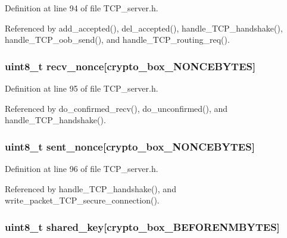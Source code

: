 Definition at line 94 of file T\+C\+P\+\_\+server.\+h.



Referenced by add\+\_\+accepted(), del\+\_\+accepted(), handle\+\_\+\+T\+C\+P\+\_\+handshake(), handle\+\_\+\+T\+C\+P\+\_\+oob\+\_\+send(), and handle\+\_\+\+T\+C\+P\+\_\+routing\+\_\+req().

\hypertarget{struct_t_c_p___secure___connection_aae0467706f97aa3ef23e5dc9c3c199d7}{
\subsubsection[{recv\+\_\+nonce}]{\setlength{\rightskip}{0pt plus 5cm}uint8\+\_\+t recv\+\_\+nonce\mbox{[}crypto\+\_\+box\+\_\+\+N\+O\+N\+C\+E\+B\+Y\+T\+E\+S\mbox{]}}}\label{struct_t_c_p___secure___connection_aae0467706f97aa3ef23e5dc9c3c199d7}


Definition at line 95 of file T\+C\+P\+\_\+server.\+h.



Referenced by do\+\_\+confirmed\+\_\+recv(), do\+\_\+unconfirmed(), and handle\+\_\+\+T\+C\+P\+\_\+handshake().

\hypertarget{struct_t_c_p___secure___connection_a9df0e00e8f493ed6cd1ff45e7da33c0d}{
\subsubsection[{sent\+\_\+nonce}]{\setlength{\rightskip}{0pt plus 5cm}uint8\+\_\+t sent\+\_\+nonce\mbox{[}crypto\+\_\+box\+\_\+\+N\+O\+N\+C\+E\+B\+Y\+T\+E\+S\mbox{]}}}\label{struct_t_c_p___secure___connection_a9df0e00e8f493ed6cd1ff45e7da33c0d}


Definition at line 96 of file T\+C\+P\+\_\+server.\+h.



Referenced by handle\+\_\+\+T\+C\+P\+\_\+handshake(), and write\+\_\+packet\+\_\+\+T\+C\+P\+\_\+secure\+\_\+connection().

\hypertarget{struct_t_c_p___secure___connection_a81ead9fac55a0cedc30a96253a2c5119}{
\subsubsection[{shared\+\_\+key}]{\setlength{\rightskip}{0pt plus 5cm}uint8\+\_\+t shared\+\_\+key\mbox{[}crypto\+\_\+box\+\_\+\+B\+E\+F\+O\+R\+E\+N\+M\+B\+Y\+T\+E\+S\mbox{]}}}\label{struct_t_c_p___secure___connection_a81ead9fac55a0cedc30a96253a2c5119}


